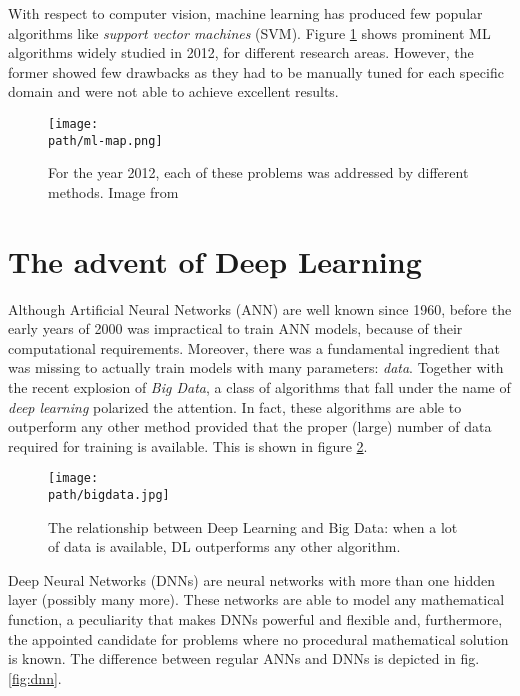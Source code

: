 With respect to computer vision, machine learning has produced few popular algorithms like \emph{support vector machines} (SVM).
Figure \ref{fig:ml-map} shows prominent ML algorithms widely studied in 2012, for different research areas. However, the former showed few drawbacks as they had to be manually tuned for each specific domain and were not able to achieve excellent results. 

 \begin{figure}[h!]
 \centering
 \texttt{[image: \\path/ml-map.png]} 
 \caption{For the year 2012, each of these problems was addressed by different methods. Image from \parencite{cnn-design}}
 \label{fig:ml-map}
\end{figure}




\section{The advent of Deep Learning}
 Although Artificial Neural Networks (ANN) are well known since 1960, before the early years of 2000 was impractical to train ANN models, because of their computational requirements. Moreover, there was a fundamental ingredient that was missing to actually train models with many parameters: \emph{data}. Together with the recent explosion of \emph{Big Data}, a class of algorithms that fall under the name of \emph{deep learning} polarized the attention. In fact, these algorithms are able to outperform any other method provided that the proper (large) number of data required for training is available. This is shown in figure \ref{fig:bigdata}.
\\ 
 
 \begin{figure}[h!]
 \centering
 \texttt{[image: \\path/bigdata.jpg]} 
 \caption{The relationship between Deep Learning and Big Data: when a lot of data is available, DL outperforms any other algorithm.}
 \label{fig:bigdata}
\end{figure}
 
Deep Neural Networks (DNNs) are neural networks with more than one hidden layer (possibly many more). These networks are able to model any mathematical function, a peculiarity that makes DNNs powerful and flexible and, furthermore, the appointed candidate for problems where no procedural mathematical solution is known. The difference between regular ANNs and DNNs is depicted in fig. \ref{fig:dnn}. 

